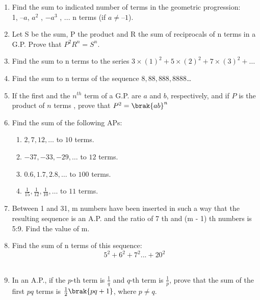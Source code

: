 \begin{enumerate}[label=\thesection.\arabic*,ref=\thesection.\theenumi]
\item Find the sum to indicated number of terms in the geometric progression:\\
1, $– a$, $a^2$
, $-a^3$
, ... n terms (if $a \neq – 1$).\\
\solution
\pagebreak

\item Let S be the sum, P the product and R the sum of reciprocals of n terms in a G.P.
Prove that $P^2 R^n = S^n$.\\
\solution
\pagebreak
\item Find the sum to n terms to the series $3\times(1)^2+5\times(2)^2+7\times(3)^2+ \ldots$\\
\solution
\pagebreak
\item Find the sum to n terms of the sequence $8,88,888,8888$\ldots\\
\solution
\pagebreak

\item If the first and the  $n^{th}$  term of a G.P. are $a$ and $b$, respectively, and if $P$ is the product of $n$ terms , prove that $ P^2 = \brak{ab}^n $ \\
\solution

\pagebreak

\item Find the sum of the following APs:
\begin{enumerate}[label=(\alph*)]
\item $2, 7, 12, \ldots$ to $10$ terms.
\item $-37, -33, -29, \ldots$ to $12$ terms.
\item $0.6, 1.7, 2.8, \ldots$ to $100$ terms.
\item $\frac{1}{15}, \frac{1}{12}, \frac{1}{10}, \ldots$ to $11$ terms.
\end{enumerate}
\solution
\pagebreak

\item Between 1 and 31, m numbers have been inserted in such a way that the resulting sequence is an A.P. and 
the ratio of 7 th and (m - 1) th numbers is 5:9. Find the value of m.\\
\solution

\pagebreak
\item Find the sum of n terms of this sequence:$$5^2+6^2+7^2...+20^2$$  \\
\solution
\pagebreak

\item In an A.P., if the $p$-th term is $\frac{1}{q}$ and $q$-th term is $\frac{1}{p}$, prove that the sum of the first $pq$ terms is $\frac{1}{2}\brak{pq + 1}$, where $p \neq q$.\\
\solution

\pagebreak
\end{enumerate}
